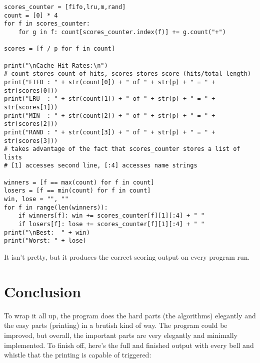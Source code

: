 \documentclass[11pt]{article}
\begin{document}
\begin{lstlisting}
scores_counter = [fifo,lru,m,rand]
count = [0] * 4
for f in scores_counter:
	for g in f: count[scores_counter.index(f)] += g.count("+")

scores = [f / p for f in count]

print("\nCache Hit Rates:\n")
# count stores count of hits, scores stores score (hits/total length)
print("FIFO : " + str(count[0]) + " of " + str(p) + " = " + str(scores[0]))
print("LRU  : " + str(count[1]) + " of " + str(p) + " = " + str(scores[1]))
print("MIN  : " + str(count[2]) + " of " + str(p) + " = " + str(scores[2]))
print("RAND : " + str(count[3]) + " of " + str(p) + " = " + str(scores[3]))
# takes advantage of the fact that scores_counter stores a list of lists
# [1] accesses second line, [:4] accesses name strings

winners = [f == max(count) for f in count]
losers = [f == min(count) for f in count]
win, lose = "", ""
for f in range(len(winners)):
	if winners[f]: win += scores_counter[f][1][:4] + " "
	if losers[f]: lose += scores_counter[f][1][:4] + " "
print("\nBest:  " + win)
print("Worst: " + lose)
\end{lstlisting}

It isn't pretty, but it produces the correct scoring output on every program run.

\section{Conclusion}

To wrap it all up, the program does the hard parts (the algorithms) elegantly and the easy parts (printing) in a brutish kind of way.
The program could be improved, but overall, the important parts are very elegantly and minimally implemented.
To finish off, here's the full and finished output with every bell and whistle that the printing is capable of triggered:
\end{document}
